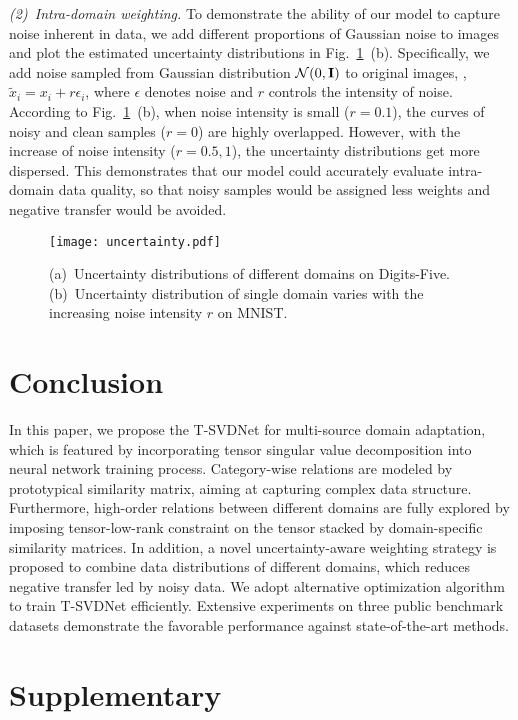 \documentclass[10pt,twocolumn,letterpaper]{article}
\begin{document}
\textit{(2)~Intra-domain weighting.} To demonstrate the ability of our model to capture noise inherent in data, we add different proportions of Gaussian noise to images and plot the estimated uncertainty distributions in Fig.~\ref{fig5}~(b). Specifically, we add noise sampled from Gaussian distribution $\mathcal{N}(0,\bf{I})$ to original images, \ie, $\tilde{x}_i = x_i + r\epsilon_i$, where $\epsilon$ denotes noise and $r$ controls the intensity of noise. According to Fig.~\ref{fig5}~(b), when noise intensity is small ($r=0.1$), the curves of noisy and clean samples ($r=0$) are highly overlapped. However, with the increase of noise intensity ($r=0.5,1$), the uncertainty distributions get more dispersed. This demonstrates that our model could accurately evaluate intra-domain data quality, so that noisy samples would be assigned less weights and negative transfer would be avoided.
\begin{figure}
	\centering
	\texttt{[image: uncertainty.pdf]}\\
	\caption{(a)~Uncertainty distributions of different domains on Digits-Five. (b)~Uncertainty distribution of single domain varies with the increasing noise intensity $r$ on MNIST.}
	\label{fig5}
	\vspace{-1em}
\end{figure}
\section{Conclusion}
In this paper, we propose the T-SVDNet for multi-source domain adaptation, which is featured by incorporating tensor singular value decomposition into neural network training process. Category-wise relations are modeled by prototypical similarity matrix, aiming at capturing complex data structure. Furthermore, high-order relations between different domains are fully explored by imposing tensor-low-rank constraint on the tensor stacked by domain-specific similarity matrices. In addition, a novel uncertainty-aware weighting strategy is proposed to combine data distributions of different domains, which reduces negative transfer led by noisy data. We adopt alternative optimization algorithm to train T-SVDNet efficiently. Extensive experiments on three public benchmark datasets demonstrate the favorable performance against state-of-the-art methods. 

{\small
	
	
}
\section{Supplementary}
\end{document}
